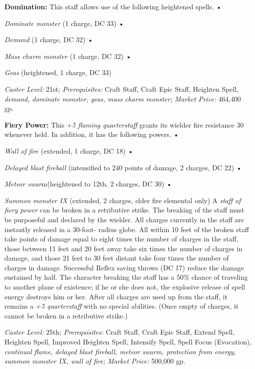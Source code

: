 \documentclass{article}
\begin{document}
\textbf{Domination: }This staff allows use of the following heightened spells. 
• 

\parindent=3pt
\textit{Dominate monster }(1 charge, DC 33) • 

\textit{Demand }(1 charge, DC 32) • 

\textit{Mass charm monster }(1 charge, DC 32) • 

\textit{Geas }(heightened, 1 charge, DC 33) 

\parindent=0pt
\textit{Caster Level: }21st; \textit{Prerequisites: }Craft Staff, Craft Epic Staff, 
Heighten Spell, \textit{demand, dominate monster, geas, mass charm monster; Market 
Price: }464,400 gp. 

\textbf{Fiery Power: }This +\textit{5 flaming quarterstaff }grants its wielder 
fire resistance 30 whenever held. In addition, it has the following powers. • 

\textit{Wall of fire }(extended, 1 charge, DC 18) • 

\textit{Delayed blast fireball }(intensified to 240 points of damage, 2 charges, 
DC 22) • 

\textit{Meteor swar}m(heightened to 12th, 2 charges, DC 30) • 

\textit{Summon monster IX }(extended, 2 charges, elder fire elemental only) A \textit{staff 
of fiery power }can be broken in a retributive strike. The breaking of the staff 
must be purposeful and declared by the wielder. All charges currently in the staff 
are instantly released in a 30-foot- radius globe. All within 10 feet of the broken 
staff take points of damage equal to eight times the number of charges in the staff, 
those between 11 feet and 20 feet away take six times the number of charges in 
damage, and those 21 feet to 30 feet distant take four times the number of charges 
in damage. Successful Reflex saving throws (DC 17) reduce the damage sustained 
by half. The character breaking the staff has a 50\% chance of traveling to another 
plane of existence; if he or she does not, the explosive release of spell energy 
destroys him or her. After all charges are used up from the staff, it remains a 
+\textit{5 quarterstaff }with no special abilities. (Once empty of charges, it 
cannot be broken in a retributive strike.) 

\textit{Caster Level: }25th; \textit{Prerequisites: }Craft Staff, Craft Epic Staff, 
Extend Spell, Heighten Spell, Improved Heighten Spell, Intensify Spell, Spell Focus 
(Evocation), \textit{continual flame, delayed blast fireball, meteor swarm, protection 
from energy, summon monster IX, wall of fire; Market Price: }500,000 gp. 
\end{document}
